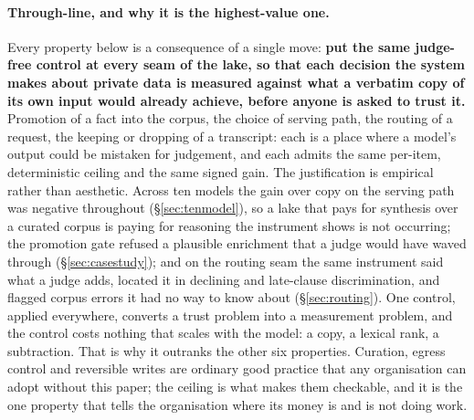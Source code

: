 \documentclass[10pt,twocolumn]{article}
\begin{document}
\paragraph{Through-line, and why it is the highest-value one.} Every property below is a consequence of a single move: \textbf{put the same judge-free control at every seam of the lake, so that each decision the system makes about private data is measured against what a verbatim copy of its own input would already achieve, before anyone is asked to trust it.} Promotion of a fact into the corpus, the choice of serving path, the routing of a request, the keeping or dropping of a transcript: each is a place where a model's output could be mistaken for judgement, and each admits the same per-item, deterministic ceiling and the same signed gain. The justification is empirical rather than aesthetic. Across ten models the gain over copy on the serving path was negative throughout (\S\ref{sec:tenmodel}), so a lake that pays for synthesis over a curated corpus is paying for reasoning the instrument shows is not occurring; the promotion gate refused a plausible enrichment that a judge would have waved through (\S\ref{sec:casestudy}); and on the routing seam the same instrument said what a judge adds, located it in declining and late-clause discrimination, and flagged corpus errors it had no way to know about (\S\ref{sec:routing}). One control, applied everywhere, converts a trust problem into a measurement problem, and the control costs nothing that scales with the model: a copy, a lexical rank, a subtraction. That is why it outranks the other six properties. Curation, egress control and reversible writes are ordinary good practice that any organisation can adopt without this paper; the ceiling is what makes them checkable, and it is the one property that tells the organisation where its money is and is not doing work.
\end{document}
